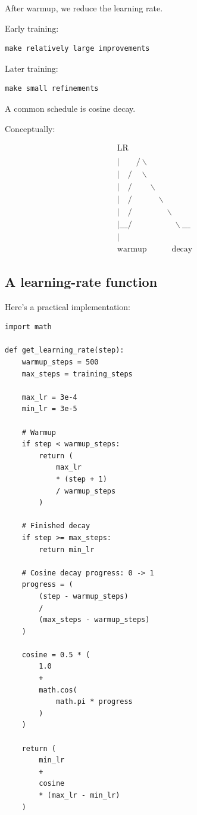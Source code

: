 After warmup, we reduce the learning rate.

Early training:

\begin{lstlisting}[style=shadedpython,language={}]
make relatively large improvements
\end{lstlisting}

Later training:

\begin{lstlisting}[style=shadedpython,language={}]
make small refinements
\end{lstlisting}

A common schedule is cosine decay.

Conceptually:

\[
\begin{array}{c}
\text{LR} \\
\\
\mid \quad \quad /\backslash \\
\mid \quad /\quad\backslash \\
\mid \quad /\quad\quad\backslash \\
\mid \quad /\quad\quad\quad\backslash \\
\mid \quad /\quad\quad\quad\quad\backslash \\
\mid \_\_\_/\quad\quad\quad\quad\quad\backslash\_\_\_ \\
\mid \\
\text{warmup} \quad\quad\quad \text{decay}
\end{array}
\]

\subsection{A learning-rate function}

Here's a practical implementation:

\begin{lstlisting}[style=shadedpython]
import math

def get_learning_rate(step):
    warmup_steps = 500
    max_steps = training_steps

    max_lr = 3e-4
    min_lr = 3e-5

    # Warmup
    if step < warmup_steps:
        return (
            max_lr
            * (step + 1)
            / warmup_steps
        )

    # Finished decay
    if step >= max_steps:
        return min_lr

    # Cosine decay progress: 0 -> 1
    progress = (
        (step - warmup_steps)
        /
        (max_steps - warmup_steps)
    )

    cosine = 0.5 * (
        1.0
        +
        math.cos(
            math.pi * progress
        )
    )

    return (
        min_lr
        +
        cosine
        * (max_lr - min_lr)
    )
\end{lstlisting}

